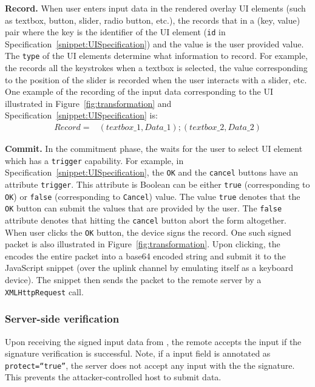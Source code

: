 \begin{mylist}
\item \textbf{Record.} When user enters input data in the rendered overlay UI elements (such as textbox, button, slider, radio button, etc.), the \device records that in a (key, value) pair where the key is the identifier of the UI element (\texttt{id} in Specification~\ref{snippet:UISpecification}) and the value is the user provided value. The \texttt{type} of the UI elements determine what information to record. For example, the \device records all the keystrokes when a textbox is selected, the value corresponding to the position of the slider is recorded when the user interacts with a slider, etc. One example of the recording of the input data corresponding to the UI illustrated in Figure~\ref{fig:transformation} and Specification~\ref{snippet:UISpecification} is: 
\begin{align*}
Record = & (textbox\_1, Data\_1);(textbox\_2,Data\_2)
\end{align*}

\item \textbf{Commit.} In the commitment phase, the \device waits for the user to select UI element which has a \texttt{trigger} capability. For example, in Specification~\ref{snippet:UISpecification}, the \texttt{OK} and the \texttt{cancel} buttons have an attribute \texttt{trigger}. This attribute is Boolean can be either \texttt{true} (corresponding to \texttt{OK}) or \texttt{false} (corresponding to \texttt{Cancel}) value. The value \texttt{true} denotes that the \texttt{OK} button can submit the values that are provided by the user. The \texttt{false} attribute denotes that hitting the \texttt{cancel} button abort the form altogether. When user clicks the \texttt{OK} button, the device signs the record. One such signed packet is also illustrated in Figure~\ref{fig:transformation}. Upon clicking, the \device encodes the entire packet into a base64 encoded string and submit it to the \name JavaScript snippet (over the uplink channel by emulating itself as a keyboard device). The \name \js snippet then sends the packet to the remote server by a \texttt{XMLHttpRequest} call.
\end{mylist}

\subsubsection{Server-side verification} \label{sec:systemDesign:commit:verification}Upon receiving the signed input data from \device, the remote accepts the input if the signature verification is successful. Note, if a input field is annotated as \texttt{protect=``true''}, the server does not accept any input with the the \device signature. This prevents the attacker-controlled host to submit data. 

